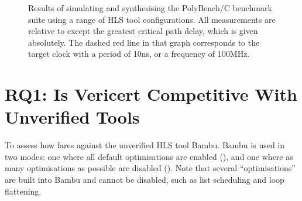 \begin{figure}
  \centering
  \newcommand\y[1]{\benchmark{#1}}
  \resizebox{\linewidth}{!}{}
  \caption[Benchmark results compared to Bambu HLS and other Vericert versions.]{Results of simulating and synthesising the PolyBench/C benchmark suite using a range of HLS tool configurations. All measurements are relative to \BambuDefault{} except the greatest critical path delay, which is given absolutely. The dashed red line in that graph corresponds to the target clock with a period of 10ns, or a frequency of 100MHz.}%
  \label{fig:list-against-hyper-scheduling}
\end{figure}


\section{RQ1: Is Vericert Competitive With Unverified Tools}

To assess how \VericertHyper{} fares against the unverified HLS tool Bambu.
Bambu is used in two modes: one where all default optimisations are enabled
(\BambuDefault{}), and one where as many optimisations as possible are disabled
(\BambuNoOpt{}). Note that several \enquote{optimisations} are built into Bambu
and cannot be disabled, such as list scheduling and loop flattening.

